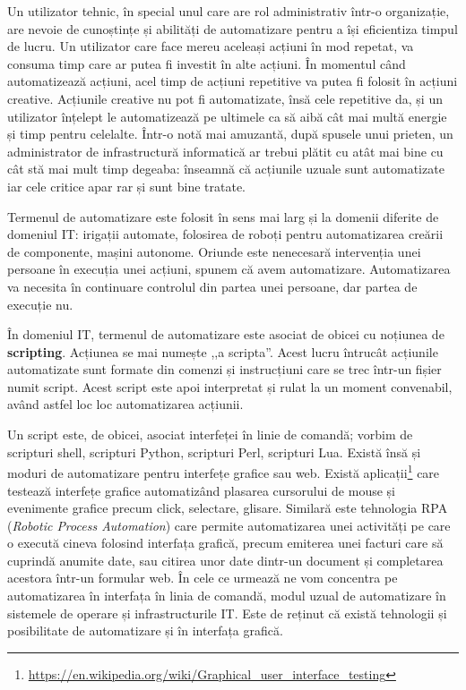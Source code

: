 Un utilizator tehnic, în special unul care are rol administrativ într-o organizație, are nevoie de cunoștințe și abilități de automatizare pentru a își eficientiza timpul de lucru.
Un utilizator care face mereu aceleași acțiuni în mod repetat, va consuma timp care ar putea fi investit în alte acțiuni.
În momentul când automatizează acțiuni, acel timp de acțiuni repetitive va putea fi folosit în acțiuni creative.
Acțiunile creative nu pot fi automatizate, însă cele repetitive da, și un utilizator înțelept le automatizează pe ultimele ca să aibă cât mai multă energie și timp pentru celelalte.
Într-o notă mai amuzantă, după spusele unui prieten, un administrator de infrastructură informatică ar trebui plătit cu atât mai bine cu cât stă mai mult timp degeaba: înseamnă că acțiunile uzuale sunt automatizate iar cele critice apar rar și sunt bine tratate.

Termenul de automatizare este folosit în sens mai larg și la domenii diferite de domeniul IT: irigații automate, folosirea de roboți pentru automatizarea creării de componente, mașini autonome.
Oriunde este nenecesară intervenția unei persoane în execuția unei acțiuni, spunem că avem automatizare.
Automatizarea va necesita în continuare controlul din partea unei persoane, dar partea de execuție nu.

În domeniul IT, termenul de automatizare este asociat de obicei cu noțiunea de \textbf{scripting}.
Acțiunea se mai numește ,,a scripta''.
Acest lucru întrucât acțiunile automatizate sunt formate din comenzi și instrucțiuni care se trec într-un fișier numit script.
Acest script este apoi interpretat și rulat la un moment convenabil, având astfel loc loc automatizarea acțiunii.


Un script este, de obicei, asociat interfeței în linie de comandă; vorbim de scripturi shell, scripturi Python, scripturi Perl, scripturi Lua.
Există însă și moduri de automatizare pentru interfețe grafice sau web.
Există aplicații\footnote{\url{https://en.wikipedia.org/wiki/Graphical\_user\_interface\_testing}} care testează interfețe grafice automatizând plasarea cursorului de mouse și evenimente grafice precum click, selectare, glisare.
Similară este tehnologia RPA (\textit{Robotic Process Automation}) care permite automatizarea unei activități pe care o execută cineva folosind interfața grafică, precum emiterea unei facturi care să cuprindă anumite date, sau citirea unor date dintr-un document și completarea acestora într-un formular web.
În cele ce urmează ne vom concentra pe automatizarea în interfața în linia de comandă, modul uzual de automatizare în sistemele de operare și infrastructurile IT.
Este de reținut că există tehnologii și posibilitate de automatizare și în interfața grafică.

